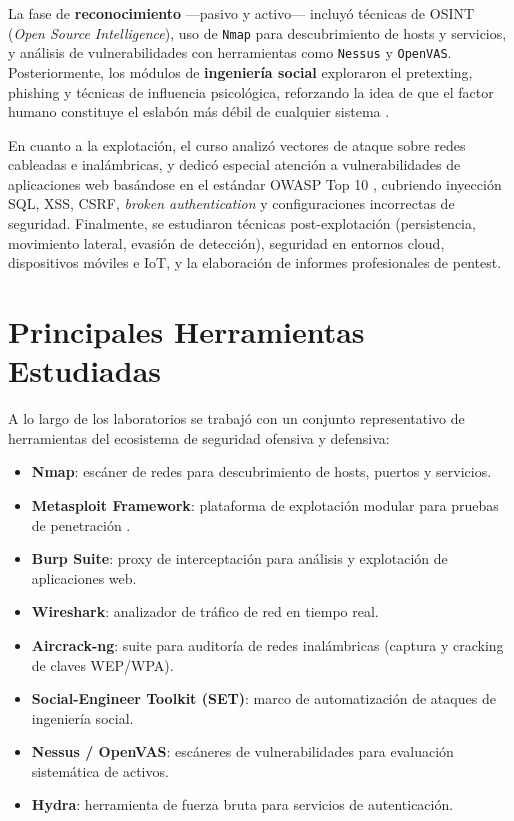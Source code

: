\documentclass[12pt, a4paper]{article}
\begin{document}
La fase de \textbf{reconocimiento} —pasivo y activo— incluyó técnicas de OSINT (\textit{Open Source Intelligence}), uso de \texttt{Nmap} para descubrimiento de hosts y servicios, y análisis de vulnerabilidades con herramientas como \texttt{Nessus} y \texttt{OpenVAS}. Posteriormente, los módulos de \textbf{ingeniería social} exploraron el pretexting, phishing y técnicas de influencia psicológica, reforzando la idea de que el factor humano constituye el eslabón más débil de cualquier sistema \citep{Hadnagy2018}.

En cuanto a la explotación, el curso analizó vectores de ataque sobre redes cableadas e inalámbricas, y dedicó especial atención a vulnerabilidades de aplicaciones web basándose en el estándar OWASP Top 10 \citep{OWASP2021}, cubriendo inyección SQL, XSS, CSRF, \textit{broken authentication} y configuraciones incorrectas de seguridad. Finalmente, se estudiaron técnicas post-explotación (persistencia, movimiento lateral, evasión de detección), seguridad en entornos cloud, dispositivos móviles e IoT, y la elaboración de informes profesionales de pentest.

\section{Principales Herramientas Estudiadas}

A lo largo de los laboratorios se trabajó con un conjunto representativo de herramientas del ecosistema de seguridad ofensiva y defensiva:

\begin{itemize}[noitemsep, topsep=2pt]
    \item \textbf{Nmap}: escáner de redes para descubrimiento de hosts, puertos y servicios.
    \item \textbf{Metasploit Framework}: plataforma de explotación modular para pruebas de penetración \citep{Kennedy2011}.
    \item \textbf{Burp Suite}: proxy de interceptación para análisis y explotación de aplicaciones web.
    \item \textbf{Wireshark}: analizador de tráfico de red en tiempo real.
    \item \textbf{Aircrack-ng}: suite para auditoría de redes inalámbricas (captura y cracking de claves WEP/WPA).
    \item \textbf{Social-Engineer Toolkit (SET)}: marco de automatización de ataques de ingeniería social.
    \item \textbf{Nessus / OpenVAS}: escáneres de vulnerabilidades para evaluación sistemática de activos.
    \item \textbf{Hydra}: herramienta de fuerza bruta para servicios de autenticación.
\end{itemize}
\end{document}
